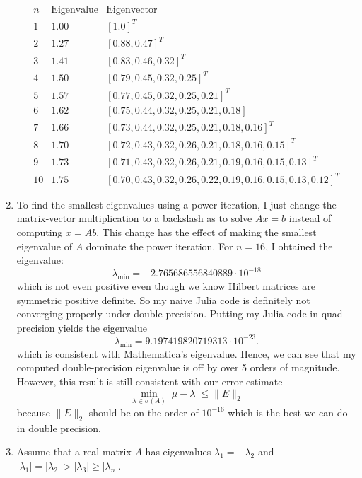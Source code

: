 \documentclass[a4paper,12pt]{article}
\newcommand{\abs}[1]{\left| #1 \right|}
\newcommand{\norm}[1]{\lVert #1 \rVert}
\begin{document}
\begin{enumerate}[label = (\arabic*)]
	\[
		\begin{array}{rcl}
			n  & \text{Eigenvalue} & \text{Eigenvector} \\
			1  & 1.00 & [1.0]^T \\
			2  & 1.27 & [0.88, 0.47]^T \\
			3  & 1.41 & [0.83, 0.46, 0.32]^T \\
			4  & 1.50 & [0.79, 0.45, 0.32, 0.25]^T \\
			5  & 1.57 & [0.77, 0.45, 0.32, 0.25, 0.21]^T \\
			6  & 1.62 & [0.75, 0.44, 0.32, 0.25, 0.21, 0.18] \\
			7  & 1.66 & [0.73, 0.44, 0.32, 0.25, 0.21, 0.18, 0.16]^T \\
			8  & 1.70 & [0.72, 0.43, 0.32, 0.26, 0.21, 0.18, 0.16, 0.15]^T \\
			9  & 1.73 & [0.71, 0.43, 0.32, 0.26, 0.21, 0.19, 0.16, 0.15, 0.13]^T \\
			10 & 1.75 & [0.70, 0.43, 0.32, 0.26, 0.22, 0.19, 0.16, 0.15, 0.13, 0.12]^T
		\end{array}
	\]
	
	\newpage
	\item To find the smallest eigenvalues using a power iteration, I just change the matrix-vector multiplication to a backslash as to solve $ Ax = b $ instead of computing $ x = Ab $. This change has the effect of making the smallest eigenvalue of $ A $ dominate the power iteration. For $ n = 16 $, I obtained the eigenvalue:
	\[
		\lambda_{\min} = -2.765686556840889 \cdot 10^{-18}
	\]
	which is not even positive even though we know Hilbert matrices are symmetric positive definite. So my naive Julia code is definitely not converging properly under double precision. Putting my Julia code in quad precision yields the eigenvalue
	\[
		\lambda_{\min} =  9.197419820719313\cdot 10^{-23}.
	\]
	which is consistent with Mathematica's eigenvalue. Hence, we can see that my computed double-precision eigenvalue is off by over 5 orders of magnitude. However, this result is still consistent with our error estimate
	\[
		\min_{\lambda \in \sigma(A)} \abs{\mu - \lambda} \leq \norm{E}_2
	\]
	because $ \norm{E}_2 $ should be on the order of $ 10^{-16} $ which is the best we can do in double precision.
	
	\newpage
	\item Assume that a real matrix $ A $ has eigenvalues $ \lambda_1 = -\lambda_2 $ and $ \abs{\lambda_1} = \abs{\lambda_2} > \abs{\lambda_3} \geq \abs{\lambda_n} $. 
	

\end{enumerate}
\end{document}
